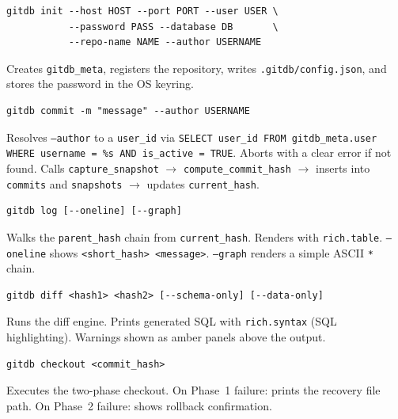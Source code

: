 \documentclass[12pt, a4paper]{article}
\begin{document}
\begin{tcolorbox}[commandbox, title=\texttt{gitdb init}]
\begin{lstlisting}
gitdb init --host HOST --port PORT --user USER \
           --password PASS --database DB       \
           --repo-name NAME --author USERNAME
\end{lstlisting}
\textcolor{codetext}{\small Creates \texttt{gitdb\_meta}, registers the
repository, writes \texttt{.gitdb/config.json}, and stores the password
in the OS keyring.}
\end{tcolorbox}

\begin{tcolorbox}[commandbox, title=\texttt{gitdb commit}]
\begin{lstlisting}
gitdb commit -m "message" --author USERNAME
\end{lstlisting}
\textcolor{codetext}{\small Resolves \texttt{--author} to a \texttt{user\_id}
via \texttt{SELECT user\_id FROM gitdb\_meta.user WHERE username = \%s AND
is\_active = TRUE}. Aborts with a clear error if not found. Calls
\texttt{capture\_snapshot} $\to$ \texttt{compute\_commit\_hash} $\to$ inserts
into \texttt{commits} and \texttt{snapshots} $\to$ updates
\texttt{current\_hash}.}
\end{tcolorbox}

\begin{tcolorbox}[commandbox, title=\texttt{gitdb log}]
\begin{lstlisting}
gitdb log [--oneline] [--graph]
\end{lstlisting}
\textcolor{codetext}{\small Walks the \texttt{parent\_hash} chain from
\texttt{current\_hash}. Renders with \texttt{rich.table}.
\texttt{--oneline} shows \texttt{<short\_hash> <message>}.
\texttt{--graph} renders a simple ASCII \texttt{*} chain.}
\end{tcolorbox}

\begin{tcolorbox}[commandbox, title=\texttt{gitdb diff}]
\begin{lstlisting}
gitdb diff <hash1> <hash2> [--schema-only] [--data-only]
\end{lstlisting}
\textcolor{codetext}{\small Runs the diff engine. Prints generated SQL
with \texttt{rich.syntax} (SQL highlighting). Warnings shown as amber
panels above the output.}
\end{tcolorbox}

\begin{tcolorbox}[commandbox, title=\texttt{gitdb checkout}]
\begin{lstlisting}
gitdb checkout <commit_hash>
\end{lstlisting}
\textcolor{codetext}{\small Executes the two-phase checkout. On Phase~1
failure: prints the recovery file path. On Phase~2 failure: shows rollback
confirmation.}
\end{tcolorbox}
\end{document}
